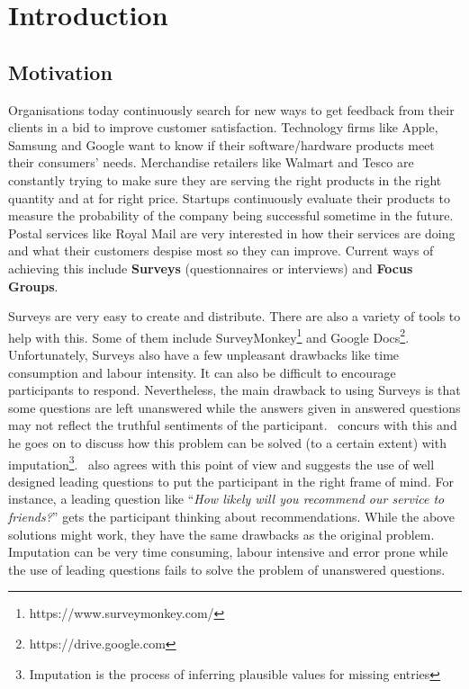 
\chapter{Introduction}
\label{cha:introduction}

\section{Motivation}
\label{sec:motivation}
Organisations today continuously search for new ways to get feedback from their clients in a bid to
improve customer satisfaction. Technology firms like Apple, Samsung and Google want to know if their
software/hardware products meet their consumers' needs. Merchandise retailers like Walmart and Tesco
are constantly trying to make sure they are serving the right products in the right quantity and at
for right price. Startups continuously evaluate their products to measure the probability of the
company being successful sometime in the future. Postal services like Royal Mail are very interested
in how their services are doing and what their customers despise most so they can improve. Current
ways of achieving this include \textbf{Surveys} (questionnaires or interviews) and \textbf{Focus
Groups}.

Surveys are very easy to create and distribute. There are also a variety of tools to help with this.
Some of them include SurveyMonkey\footnote{https://www.surveymonkey.com/} and Google
Docs\footnote{https://drive.google.com}. Unfortunately, Surveys also have a few unpleasant drawbacks
like time consumption and labour intensity. It can also be difficult to encourage participants to
respond. Nevertheless, the main drawback to using Surveys is that some questions are left unanswered
while the answers given in answered questions may not reflect the truthful sentiments of the
participant.~\citet{rubin1987} concurs with this and he goes on to discuss how this problem can be
solved (to a certain extent) with imputation\footnote{Imputation is the process of inferring
plausible values for missing entries}.~\citet{hayes2008} also agrees with this point of view and
suggests the use of well designed leading questions to put the participant in the right frame of
mind. For instance, a leading question like ``\textit{How likely will you recommend our service to
friends?}'' gets the participant thinking about recommendations. While the above solutions might
work, they have the same drawbacks as the original problem. Imputation can be very time
consuming, labour intensive and error prone while the use of leading questions fails to solve the
problem of unanswered questions.

